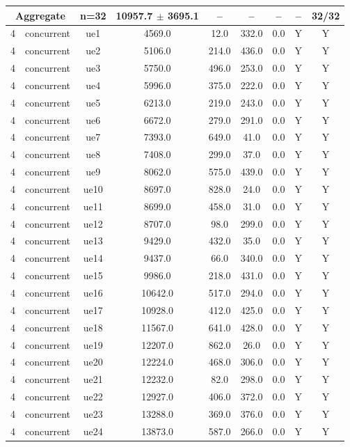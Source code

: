 \begin{table}[ht]
\begin{tabular}{|c|c|c|c|c|c|c|c|c|}
\multicolumn{2}{|c|}{\textbf{Aggregate}} & n=32 & 10957.7 $\pm$ 3695.1 & -- & -- & -- & -- & 32/32 \\
\hline
4 & concurrent & ue1 & 4569.0 & 12.0 & 332.0 & 0.0 & Y & Y \\
4 & concurrent & ue2 & 5106.0 & 214.0 & 436.0 & 0.0 & Y & Y \\
4 & concurrent & ue3 & 5750.0 & 496.0 & 253.0 & 0.0 & Y & Y \\
4 & concurrent & ue4 & 5996.0 & 375.0 & 222.0 & 0.0 & Y & Y \\
4 & concurrent & ue5 & 6213.0 & 219.0 & 243.0 & 0.0 & Y & Y \\
4 & concurrent & ue6 & 6672.0 & 279.0 & 291.0 & 0.0 & Y & Y \\
4 & concurrent & ue7 & 7393.0 & 649.0 & 41.0 & 0.0 & Y & Y \\
4 & concurrent & ue8 & 7408.0 & 299.0 & 37.0 & 0.0 & Y & Y \\
4 & concurrent & ue9 & 8062.0 & 575.0 & 439.0 & 0.0 & Y & Y \\
4 & concurrent & ue10 & 8697.0 & 828.0 & 24.0 & 0.0 & Y & Y \\
4 & concurrent & ue11 & 8699.0 & 458.0 & 31.0 & 0.0 & Y & Y \\
4 & concurrent & ue12 & 8707.0 & 98.0 & 299.0 & 0.0 & Y & Y \\
4 & concurrent & ue13 & 9429.0 & 432.0 & 35.0 & 0.0 & Y & Y \\
4 & concurrent & ue14 & 9437.0 & 66.0 & 340.0 & 0.0 & Y & Y \\
4 & concurrent & ue15 & 9986.0 & 218.0 & 431.0 & 0.0 & Y & Y \\
4 & concurrent & ue16 & 10642.0 & 517.0 & 294.0 & 0.0 & Y & Y \\
4 & concurrent & ue17 & 10928.0 & 412.0 & 425.0 & 0.0 & Y & Y \\
4 & concurrent & ue18 & 11567.0 & 641.0 & 428.0 & 0.0 & Y & Y \\
4 & concurrent & ue19 & 12207.0 & 862.0 & 26.0 & 0.0 & Y & Y \\
4 & concurrent & ue20 & 12224.0 & 468.0 & 306.0 & 0.0 & Y & Y \\
4 & concurrent & ue21 & 12232.0 & 82.0 & 298.0 & 0.0 & Y & Y \\
4 & concurrent & ue22 & 12927.0 & 406.0 & 372.0 & 0.0 & Y & Y \\
4 & concurrent & ue23 & 13288.0 & 369.0 & 376.0 & 0.0 & Y & Y \\
4 & concurrent & ue24 & 13873.0 & 587.0 & 266.0 & 0.0 & Y & Y \\

\end{tabular}
\end{table}
